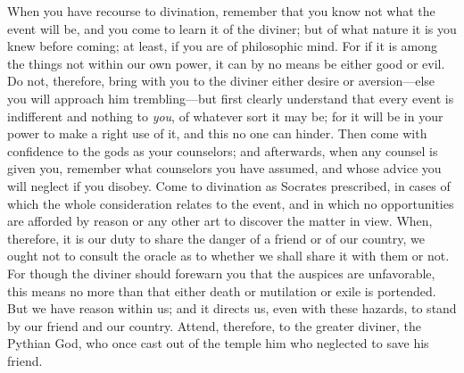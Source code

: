 When you have recourse to divination, remember that you know not what the
event will be, and you come to learn it of the diviner; but of what
nature it is you knew before coming; at least, if you are of philosophic
mind. For if it is among the things not within our own power, it can by
no means be either good or evil. Do not, therefore, bring with you to the
diviner either desire or aversion---else you will approach him
trembling---but first clearly understand that every event is indifferent
and nothing to \emph{you}, of whatever sort it may be; for it will be in your
power to make a right use of it, and this no one can hinder. Then come
with confidence to the gods as your counselors; and afterwards, when any
counsel is given you, remember what counselors you have assumed, and
whose advice you will neglect if you disobey. Come to divination as
Socrates prescribed, in cases of which the whole consideration relates to
the event, and in which no opportunities are afforded by reason or any
other art to discover the matter in view. When, therefore, it is our duty
to share the danger of a friend or of our country, we ought not to
consult the oracle as to whether we shall share it with them or not. For
though the diviner should forewarn you that the auspices are unfavorable,
this means no more than that either death or mutilation or exile is
portended. But we have reason within us; and it directs us, even with
these hazards, to stand by our friend and our country. Attend, therefore,
to the greater diviner, the Pythian God, who once cast out of the temple
him who neglected to save his friend.\footnotemark
{}

